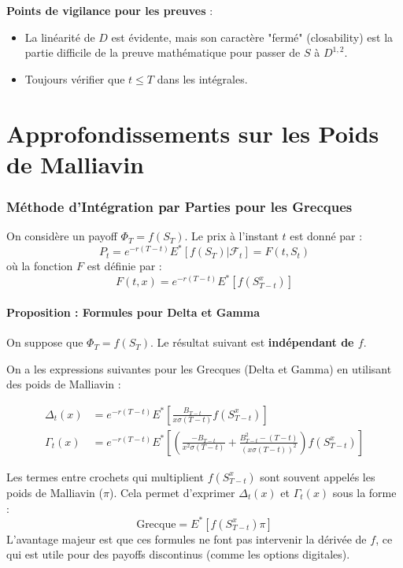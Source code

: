 \documentclass{article}
\begin{document}
\textbf{Points de vigilance pour les preuves} :
\begin{itemize}
    \item La linéarité de $D$ est évidente, mais son caractère "fermé" (closability) est la partie difficile de la preuve mathématique pour passer de $S$ à $D^{1,2}$.
    \item Toujours vérifier que $t \le T$ dans les intégrales.
\end{itemize}

\part{Approfondissements sur les Poids de Malliavin}

\section{Méthode d'Intégration par Parties pour les Grecques}

On considère un payoff $\Phi_T = f(S_T)$. Le prix à l'instant $t$ est donné par :
\[
P_t = e^{-r(T-t)} E^* [ f(S_T) | \mathcal{F}_t ] = F(t, S_t)
\]
où la fonction $F$ est définie par :
\[
F(t, x) = e^{-r(T-t)} E^* [ f(S_{T-t}^x) ]
\]

\subsection{Proposition : Formules pour Delta et Gamma}
On suppose que $\Phi_T = f(S_T)$. Le résultat suivant est \textbf{indépendant de $f$}.

On a les expressions suivantes pour les Grecques (Delta et Gamma) en utilisant des poids de Malliavin :

\begin{align*}
\Delta_t(x) &= e^{-r(T-t)} E^* \left[ \frac{B_{T-t}}{x \sigma (T-t)} f(S_{T-t}^x) \right] \\
\Gamma_t(x) &= e^{-r(T-t)} E^* \left[ \left( \frac{-B_{T-t}}{x^2 \sigma (T-t)} + \frac{B_{T-t}^2 - (T-t)}{(x \sigma (T-t))^2} \right) f(S_{T-t}^x) \right]
\end{align*}

Les termes entre crochets qui multiplient $f(S_{T-t}^x)$ sont souvent appelés les poids de Malliavin ($\pi$).
Cela permet d'exprimer $\Delta_t(x)$ et $\Gamma_t(x)$ sous la forme :
\[
\text{Grecque} = E^* [ f(S_{T-t}^x) \pi ]
\]
L'avantage majeur est que ces formules ne font pas intervenir la dérivée de $f$, ce qui est utile pour des payoffs discontinus (comme les options digitales).
\end{document}
